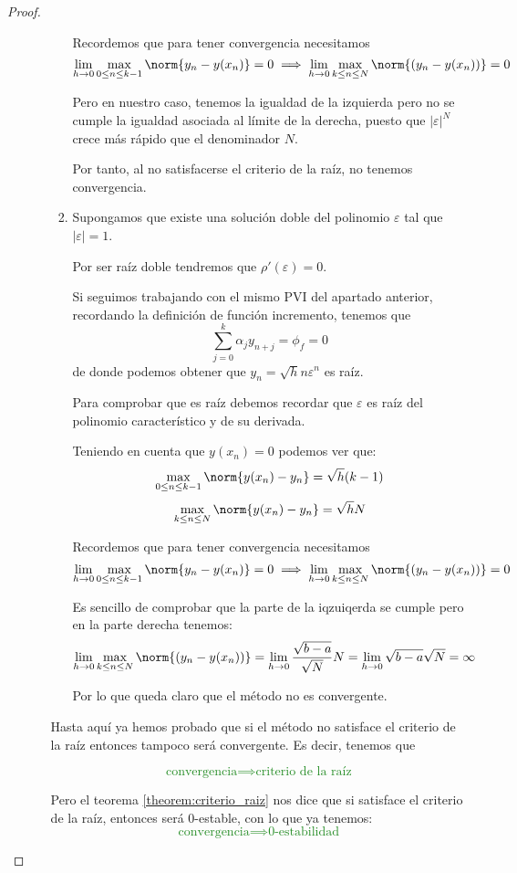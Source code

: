 \documentclass{apuntes}
\begin{document}
\begin{proof}
\begin{itemize}
\begin{enumerate}
\begin{enumerate}
Recordemos que para tener convergencia necesitamos 
\[\lim_{h \to 0} \max_{0 \leq n \leq k-1} \norm{y_n-y(x_n)}= 0 \implies \lim_{h\to 0} \max_{k\leq n \leq N}\norm{(y_n-y(x_n))} = 0\]

Pero en nuestro caso, tenemos la igualdad de la izquierda pero no se cumple la igualdad asociada al límite de la derecha, puesto que $|ε|^N$ crece más rápido que el denominador $N$.

Por tanto, al no satisfacerse el criterio de la raíz, no tenemos convergencia.

\item Supongamos que existe una solución doble del polinomio $ε$ tal que $|ε|=1$. 

Por ser raíz doble tendremos que $ρ'(ε)=0$.

Si seguimos trabajando con el mismo PVI del apartado anterior, recordando la definición de función incremento, tenemos que
\[\sum_{j=0}^kα_jy_{n+j}=\phi_f = 0\]
de donde podemos obtener que $y_n = \sqrt{h}nε^n$ es raíz.

Para comprobar que es raíz debemos recordar que $ε$ es raíz del polinomio característico y de su derivada.

Teniendo en cuenta que $y(x_n)=0$ podemos ver que:
\[\max_{0\leq n \leq k-1} \norm{y(x_n)-y_n} = \sqrt{h}(k-1)\]
\[\max_{k \leq n \leq N} \norm{y(x_n)-y_n} = \sqrt{h}N\]

Recordemos que para tener convergencia necesitamos 
\[\lim_{h \to 0} \max_{0 \leq n \leq k-1} \norm{y_n-y(x_n)}= 0 \implies \lim_{h\to 0} \max_{k\leq n \leq N}\norm{(y_n-y(x_n))} = 0\]

Es sencillo de comprobar que la parte de la iqzuiqerda se cumple pero en la parte derecha tenemos:
\[\lim_{h\to 0} \max_{k\leq n \leq N}\norm{(y_n-y(x_n))} = \lim_{h\to 0} \frac{\sqrt{b-a}}{\sqrt{N}} N = \lim_{h\to 0} \sqrt{b-a}\sqrt{N} = \infty\]

Por lo que queda claro que el método no es convergente.
\end{enumerate}

Hasta aquí ya hemos probado que si el método no satisface el criterio de la raíz entonces tampoco será convergente. Es decir, tenemos que

\textcolor{ForestGreen}{\[\text{convergencia}\implies \text{criterio de la raíz}\]}

Pero el teorema \ref{theorem:criterio_raiz} nos dice que si satisface el criterio de la raíz, entonces será 0-estable, con lo que ya tenemos:
\textcolor{ForestGreen}{\[\text{convergencia}\implies \text{0-estabilidad}\]}


\end{enumerate}
\end{itemize}
\end{proof}
\end{document}
